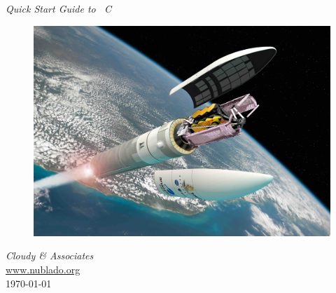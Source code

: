 \documentclass[12pt,twoside]{article}
\begin{document}

\begin{titlepage}
\begin{center}

\Huge
\emph{Quick Start Guide to \Cloudy\ C\VERSION}\\
\begin{figure}
\begin{center}
\includegraphics[clip=on,width=\columnwidth,height=0.7\textheight,keepaspectratio]{Artist_s_view_of_Webb_on_an_Ariane_5_rocket.jpeg}
\end{center}
\label{fig:header}
\end{figure}

\LARGE

\vspace{15 mm }
\LARGE
\emph{Cloudy \& Associates} \\
\Large
\href{http://www.nublado.org}{www.nublado.org} \\
\normalsize
\today
\end{center}
\end{titlepage}
\end{document}
